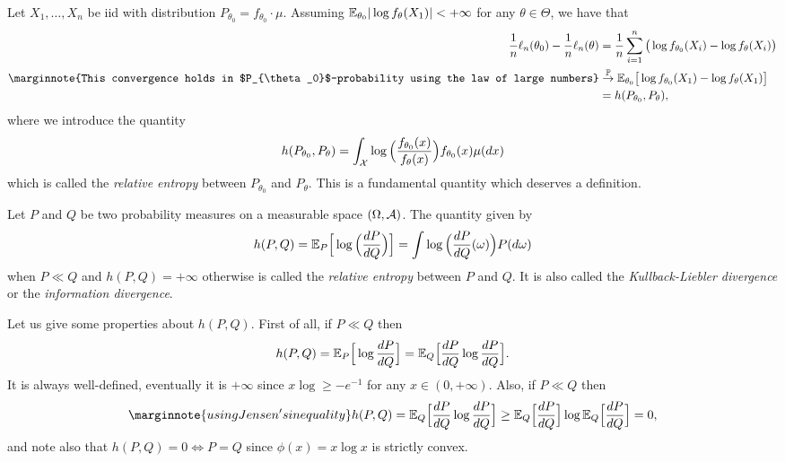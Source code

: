 Let $X_1, \ldots, X_n$ be iid with distribution $P_{\theta_0} = f_{\theta_0} \cdot \mu$.
Assuming $\mathbb E_{\theta_0} | \log f_{\theta}(X_1) | < +\infty$ for any $\theta \in \Theta$,
we have that
\begin{equation}
	\label{eq:likelihood-kullback-limit}
	\begin{split}
	\frac 1n \ell_n(\theta_0) - \frac 1n \ell_n(\theta) &= \frac 1n \sum_{i=1}^n \big(
	 \log f_{\theta_0}(X_i) - \log f_{\theta}(X_i) \big) \\
	\marginnote{This convergence holds in $P_{\theta_0}$-probability using the law of large numbers}
	& \gopro \E_{\theta_0} \big[ \log f_{\theta_0}(X_1) - \log f_{\theta}(X_1) \big] \\
	&= h(P_{\theta_0}, P_\theta),		
	\end{split}
\end{equation}
where we introduce the quantity
\begin{equation*}
	h(P_{\theta_0}, P_\theta) = \int_{\operatorname{{\mathcal X}}} \log \Big( 
	\frac{f_{\theta_0}(x)}{f_{\theta}(x)} \Big) f_{\theta_0}(x) \mu(dx)
\end{equation*}
which is called the \emph{relative entropy} between $P_{\theta_0}$ and $P_\theta$.
This is a fundamental quantity which deserves a definition.
\begin{definition}
	\label{def:relative-entropy}
	Let $P$ and $Q$ be two probability measures on a measurable space $(\Omega, \operatorname{{\mathcal A}})$. 
	The quantity given by
	\begin{equation*}
		h(P, Q) = \mathbb E_P \Big[ \log \Big( \frac{dP}{dQ} \Big) \Big] = \int \log \Big( \frac{dP}{dQ}(\omega) \Big)  P(d \omega)
	\end{equation*}
	when $P \ll Q$ and $h(P, Q) = +\infty$ otherwise is called the \emph{relative entropy} between $P$ and $Q$.
	It is also called the \emph{Kullback-Liebler divergence} or the \emph{information divergence}.
\end{definition}
Let us give some properties about $h(P, Q)$.
First of all, if $P \ll Q$ then
\begin{equation*}
	h(P, Q) = \mathbb E_P \Big[\log \frac{dP}{dQ} \Big] = \mathbb E_Q \Big[\frac{dP}{dQ} 
	\log \frac{dP}{dQ} \Big].
\end{equation*}
It is always well-defined, eventually it is $+\infty$ since $x \log \geq -e^{-1}$ for any $x \in (0, +\infty)$.
Also, if $P \ll Q$ then
\begin{equation*}
	\marginnote{using Jensen's inequality}
	h(P, Q) = \E_Q\Big[ \frac{dP}{dQ} \log \frac{dP}{dQ} \Big] 
	\geq \E_Q\Big[ \frac{dP}{dQ} \Big] \log \E_Q\Big[ \frac{dP}{dQ} \Big] 
	= 0,
\end{equation*}
and note also that $h(P, Q) = 0 \Leftrightarrow P = Q$ since $\phi(x) = x \log x$ is strictly convex.

